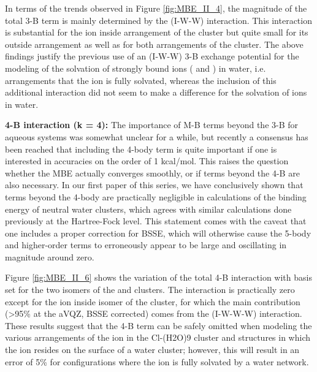 \documentclass[11pt, proquest]{uwthesis}[2020/02/24]
\let\ce\ch
\newcommand{\textapprox}{\raisebox{0.5ex}{\texttildelow}}
\begin{document}
\par In terms of the trends observed in Figure \ref{fig:MBE_II_4}, the magnitude of the total 3-B term is mainly determined by the (I-W-W) interaction. This interaction is substantial for the ion inside arrangement of the \ce{Li^+(H2O)9} cluster but quite small for its outside arrangement as well as for both arrangements of the \ce{Cl^-(H2O)9} cluster. The above findings justify the previous use of an (I-W-W) 3-B exchange potential for the modeling of the solvation of strongly bound ions (\ce{Li^+} and \ce{F^-}) in water, i.e. arrangements that the ion is fully solvated,\autocite{dang_ion_1991,xantheas_critical_1996} whereas the inclusion of this additional interaction did not seem to make a difference for the solvation of \ce{Cl^-} ions in water.\autocite{perera_structures_1994}

\textbf{4-B interaction (k = 4):} The importance of M-B terms beyond the 3-B for aqueous systems was somewhat unclear for a while, but recently a consensus has been reached that including the 4-body term is quite important if one is interested in accuracies on the order of 1 kcal/mol.\autocite{heindel_benchmark_2018,lao_understanding_2016,richard_aiming_2014,howard_n-body_2013} This raises the question whether the MBE actually converges smoothly, or if terms beyond the 4-B are also necessary. In our first paper of this series,\autocite{heindel_many-body_2020} we have conclusively shown that terms beyond the 4-body are practically negligible in calculations of the binding energy of neutral water clusters, which agrees with similar calculations done previously at the Hartree-Fock level.\autocite{ouyang_trouble_2014,ouyang_many-body_2015} This statement comes with the caveat that one includes a proper correction for BSSE, which will otherwise cause the 5-body and higher-order terms to erroneously appear to be large and oscillating in magnitude around zero.

\par Figure \ref{fig:MBE_II_6} shows the variation of the total 4-B interaction with basis set for the two isomers of the \ce{Li+(H2O)9} and \ce{Cl-(H2O)9} clusters. The interaction is practically zero except for the ion inside isomer of the \ce{Li^+(H2O)9} cluster, for which the main contribution (\textgreater 95\% at the aVQZ, BSSE corrected) comes from the (I-W-W-W) interaction. These results suggest that the 4-B term can be safely omitted when modeling the various arrangements of the ion in the Cl-(H2O)9 cluster and structures in which the \ce{Li^+} ion resides on the surface of a water cluster; however, this will result in an error of \textapprox5\% for configurations where the \ce{Li^+} ion is fully solvated by a water network.
\end{document}
